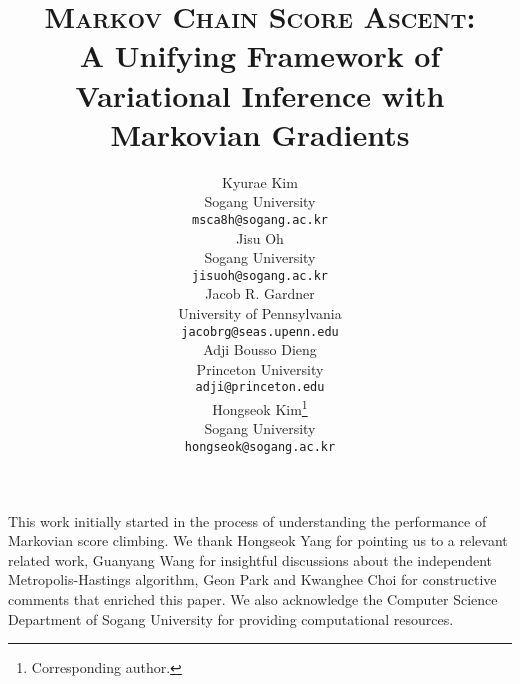 \documentclass{article}
\title{\textsc{Markov Chain Score Ascent}: \\ A Unifying Framework of \\ Variational Inference with Markovian Gradients}
\author{%
  Kyurae Kim \\
  Sogang University\\
  \texttt{msca8h@sogang.ac.kr} \\
  \And
  Jisu Oh \\
  Sogang University \\
  \texttt{jisuoh@sogang.ac.kr} \\
  \AND
  Jacob R. Gardner  \\
  University of Pennsylvania \\
  \texttt{jacobrg@seas.upenn.edu} \\
  \And
  Adji Bousso Dieng \\
  Princeton University \\
  \texttt{adji@princeton.edu} \\
  \And
  Hongseok Kim\thanks{Corresponding author.} \\
  Sogang University \\
  \texttt{hongseok@sogang.ac.kr} \\
}
\begin{document}
\maketitle

\begin{abstract}
  
\end{abstract}









\begin{ack}
  This work initially started in the process of understanding the performance of Markovian score climbing.
  We thank Hongseok Yang for pointing us to a relevant related work, Guanyang Wang for insightful discussions about the independent Metropolis-Hastings algorithm, Geon Park and Kwanghee Choi for constructive comments that enriched this paper.
  We also acknowledge the Computer Science Department of Sogang University for providing computational resources.
\end{ack}

\newpage


\newpage
\appendix


\end{document}
